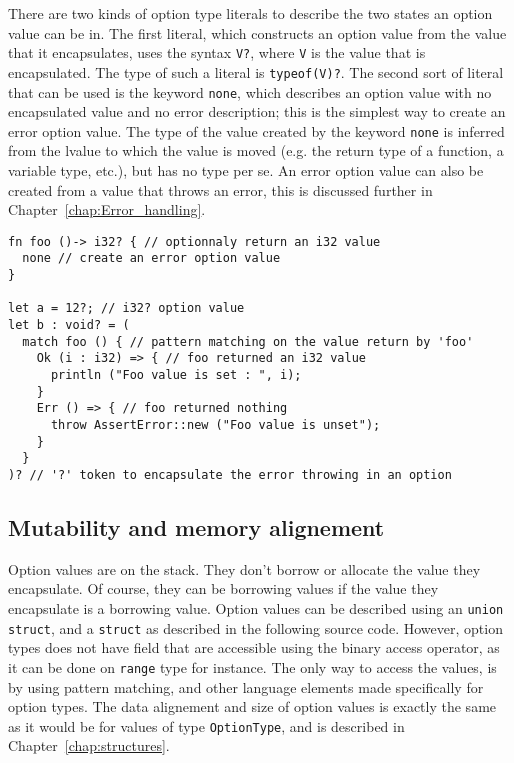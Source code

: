There are two kinds of option type literals to describe the two states an option
value can be in. The first literal, which constructs an option value from the
value that it encapsulates, uses the syntax \texttt{V?}, where \texttt{V} is the
value that is encapsulated. The type of such a literal is \texttt{typeof(V)?}.
The second sort of literal that can be used is the keyword \texttt{none}, which
describes an option value with no encapsulated value and no error description;
this is the simplest way to create an error option value. The type of the value
created by the keyword \texttt{none} is inferred from the lvalue to which the
value is moved (e.g. the return type of a function, a variable type, etc.), but
has no type per se. An error option value can also be created from a value that
throws an error, this is discussed further in Chapter~\ref{chap:Error_handling}.

\begin{lstlisting}[style=coloredverbatim]
fn foo ()-> i32? { // optionnaly return an i32 value
  none // create an error option value
}

let a = 12?; // i32? option value
let b : void? = (
  match foo () { // pattern matching on the value return by 'foo'
    Ok (i : i32) => { // foo returned an i32 value
      println ("Foo value is set : ", i);
    }
    Err () => { // foo returned nothing
      throw AssertError::new ("Foo value is unset");
    }
  }
)? // '?' token to encapsulate the error throwing in an option

\end{lstlisting}

\subsection{Mutability and memory alignement}

Option values are on the stack. They don't borrow or allocate the value they
encapsulate. Of course, they can be borrowing values if the value they
encapsulate is a borrowing value. Option values can be described using an
\texttt{union struct}, and a \texttt{struct} as described in the following
source code. However, option types does not have field that are accessible using
the binary access operator, as it can be done on \texttt{range} type for
instance. The only way to access the values, is by using pattern matching, and
other language elements made specifically for option types. The data alignement
and size of option values is exactly the same as it would be for values of type
\texttt{OptionType}, and is described in Chapter~\ref{chap:structures}.

